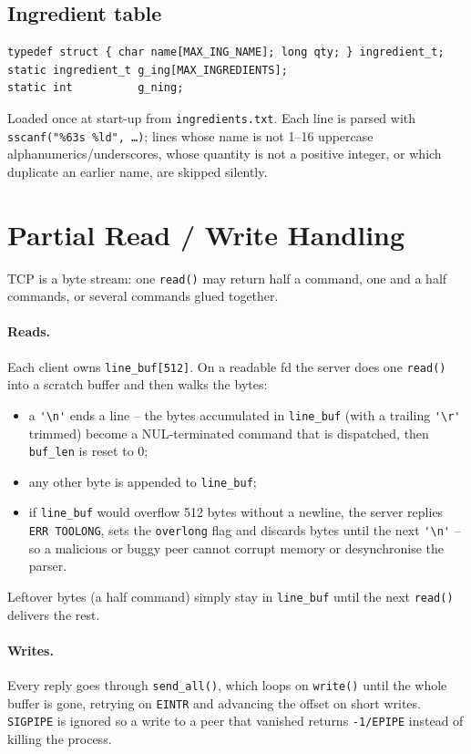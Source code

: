 \documentclass[11pt,a4paper]{article}
\begin{document}
\subsection{Ingredient table}
\begin{lstlisting}
typedef struct { char name[MAX_ING_NAME]; long qty; } ingredient_t;
static ingredient_t g_ing[MAX_INGREDIENTS];
static int          g_ning;
\end{lstlisting}
Loaded once at start-up from \texttt{ingredients.txt}. Each line is parsed with
\texttt{sscanf("\%63s \%ld", \dots)}; lines whose name is not 1--16 uppercase
alphanumerics/underscores, whose quantity is not a positive integer, or which
duplicate an earlier name, are skipped silently.

\section{Partial Read / Write Handling}
TCP is a byte stream: one \texttt{read()} may return half a command, one and a
half commands, or several commands glued together.

\paragraph{Reads.} Each client owns \texttt{line\_buf[512]}. On a readable fd the
server does one \texttt{read()} into a scratch buffer and then walks the bytes:
\begin{itemize}[nosep]
  \item a \verb|'\n'| ends a line -- the bytes accumulated in \texttt{line\_buf}
        (with a trailing \verb|'\r'| trimmed) become a NUL-terminated command
        that is dispatched, then \texttt{buf\_len} is reset to 0;
  \item any other byte is appended to \texttt{line\_buf};
  \item if \texttt{line\_buf} would overflow 512 bytes without a newline, the
        server replies \texttt{ERR TOOLONG}, sets the \texttt{overlong} flag and
        discards bytes until the next \verb|'\n'| -- so a malicious or buggy peer
        cannot corrupt memory or desynchronise the parser.
\end{itemize}
Leftover bytes (a half command) simply stay in \texttt{line\_buf} until the next
\texttt{read()} delivers the rest.

\paragraph{Writes.} Every reply goes through \texttt{send\_all()}, which loops on
\texttt{write()} until the whole buffer is gone, retrying on \texttt{EINTR} and
advancing the offset on short writes. \texttt{SIGPIPE} is ignored so a write to a
peer that vanished returns \texttt{-1/EPIPE} instead of killing the process.
\end{document}
